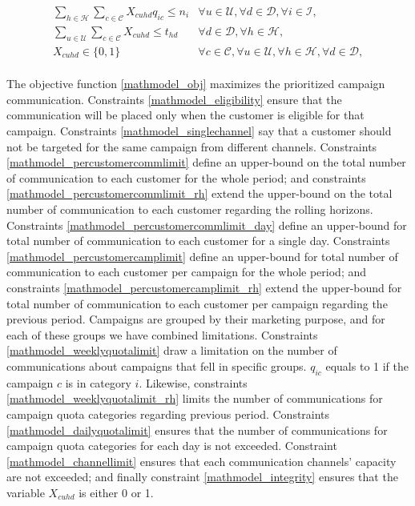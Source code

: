 \documentclass[11pt]{article}
\begin{document}
\begin{align}
&\sum\limits_{h\in\mathcal{H}}\sum\limits_{c\in\mathcal{C}}X_{{c}{u}{h}{d}}  q_{{i}{c}} \leq n_{i} &\forall u \in \mathcal{U}, \forall d \in \mathcal{D}, \forall i \in \mathcal{I}, \label{mathmodel_dailyquotalimit}&\\
&\sum\limits_{u\in\mathcal{U}}\sum\limits_{c\in\mathcal{C}}X_{{c}{u}{h}{d}} \leq t_{{h}{d}} &\forall d \in \mathcal{D}, \forall h \in \mathcal{H}, \label{mathmodel_channellimit}&\\
&X_{{c}{u}{h}{d}} \in \{0,1\}&\forall c \in \mathcal{C}, \forall u \in \mathcal{U}, \forall h \in \mathcal{H}, \forall d \in \mathcal{D}, \label{mathmodel_integrity}
\end{align}\\

The objective function \eqref{mathmodel_obj} maximizes the prioritized campaign communication. Constraints \eqref{mathmodel_eligibility} ensure that the communication will be placed only when the customer is eligible for that campaign. Constraints \eqref{mathmodel_singlechannel} say that a customer should not be targeted for the same campaign from different channels. Constraints \eqref{mathmodel_percustomercommlimit} define an upper-bound on the total number of communication to each customer for the whole period; and constraints \eqref{mathmodel_percustomercommlimit_rh} extend the upper-bound on the total number of communication to each customer regarding the rolling horizons. Constraints \eqref{mathmodel_percustomercommlimit_day} define an upper-bound for total number of communication to each customer for a single day. Constraints \eqref{mathmodel_percustomercamplimit} define an upper-bound for total number of communication to each customer per campaign for the whole period; and constraints \eqref{mathmodel_percustomercamplimit_rh} extend the upper-bound for total number of communication to each customer per campaign regarding the previous period. Campaigns are grouped by their marketing purpose, and for each of these groups we have combined limitations. Constraints \eqref{mathmodel_weeklyquotalimit} draw a limitation on the number of communications about campaigns that fell in specific groups. $q_{{i}{c}}$ equals to 1 if the campaign $c$ is in category  $i$. Likewise, constraints \eqref{mathmodel_weeklyquotalimit_rh} limits the number of communications for campaign quota categories regarding previous period. Constraints \eqref{mathmodel_dailyquotalimit} ensures that the number of communications for campaign quota categories for each day is not exceeded. Constraint \eqref{mathmodel_channellimit} ensures that each communication channels' capacity are not exceeded; and finally constraint \eqref{mathmodel_integrity} ensures that the variable $X_{{c}{u}{h}{d}}$ is either 0 or 1.\\
\end{document}

